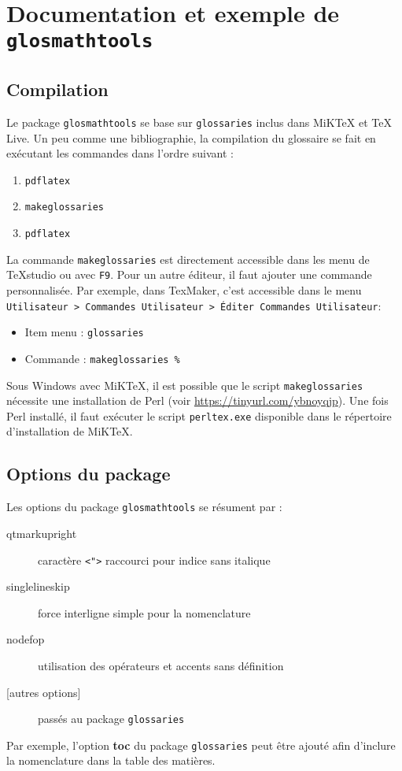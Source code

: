 \documentclass[projet,nohyperref,english,french]{ulthese}
\begin{document}
\frontmatter  
           
\frontispice
\printglossary[title=Nomenclature]

\mainmatter                     

\chapter{Documentation et exemple de \texttt{glosmathtools}}

\section{Compilation}
Le package \texttt{glosmathtools} se base sur \texttt{glossaries} inclus dans MiKTeX et TeX Live. Un peu comme une bibliographie, la compilation du glossaire se fait en exécutant les commandes dans l'ordre suivant :
\begin{enumerate}
	\item \texttt{pdflatex}
	\item \texttt{makeglossaries}
	\item \texttt{pdflatex}
\end{enumerate}
La commande \texttt{makeglossaries} est directement accessible dans les menu de TeXstudio ou avec \texttt{F9}. Pour un autre éditeur, il faut ajouter une commande personnalisée. Par exemple, dans TexMaker, c’est accessible dans le menu \texttt{Utilisateur > Commandes Utilisateur > Éditer Commandes Utilisateur}:
\begin{itemize}
	\item Item menu : \texttt{glossaries} 
	\item Commande : \texttt{makeglossaries \%}
\end{itemize}
Sous Windows avec MiKTeX, il est possible que le script \texttt{makeglossaries} nécessite une installation de Perl (voir \url{https://tinyurl.com/ybnoyqjp}). Une fois Perl installé, il faut exécuter le script \texttt{perltex.exe} disponible dans le répertoire d'installation de MiKTeX.

\section{Options du package}
Les options du package \texttt{glosmathtools} se résument par :
\begin{description}
	\item[qtmarkupright] caractère \texttt{<">} raccourci pour indice sans italique
	\item[singlelineskip] force interligne simple pour la nomenclature
	\item[nodefop] utilisation des opérateurs et accents sans définition
	\item[{[autres options]}] passés au package \texttt{glossaries}
\end{description}
Par exemple, l'option \textbf{toc} du package \texttt{glossaries} peut être ajouté afin d'inclure la nomenclature dans la table des matières.
\end{document}
